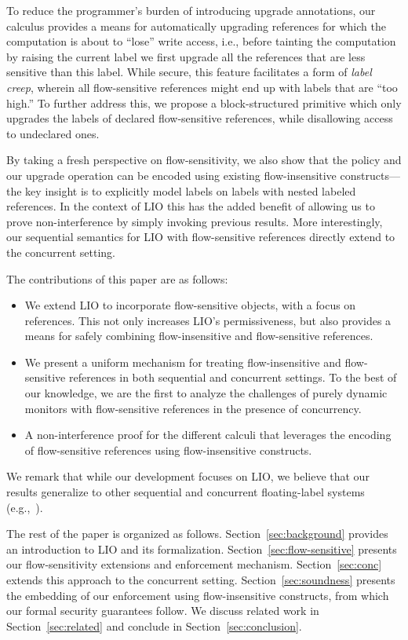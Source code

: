 To reduce the programmer's burden of introducing upgrade annotations, our
calculus provides a means for automatically upgrading references for which the
computation is about to ``lose'' write access, i.e., before tainting the
computation by raising the current label we first upgrade all the references
that are less sensitive than this label.
%
While secure, this feature facilitates a form of \emph{label creep},
wherein all flow-sensitive references might end up with labels that
are ``too high.''
%
To further address this, we propose a block-structured primitive which
only upgrades the labels of declared flow-sensitive references, while
disallowing access to undeclared ones.
 
By taking a fresh perspective on flow-sensitivity, we also show that the {\nsu}
policy and our upgrade operation can be encoded using existing flow-insensitive
constructs---the key insight is to explicitly model labels on labels with
nested labeled references.
%
In the context of LIO this has the added benefit of allowing us to prove
non-interference by simply invoking previous results.
%
More interestingly, our sequential semantics for LIO with flow-sensitive
references directly extend to the concurrent setting.
 
The contributions of this paper are as follows:
\begin{itemize}

\item We extend LIO to incorporate flow-sensitive objects, with a focus on
references. This not only increases LIO's permissiveness, but also provides a
means for safely combining flow-insensitive and flow-sensitive references.

\item We present a uniform mechanism for treating flow-insensitive and
flow-sensitive references in both sequential and concurrent settings. To the
best of our knowledge, we are the first to analyze the challenges of purely
dynamic monitors with flow-sensitive references in the presence of concurrency.

\item A non-interference proof for the different calculi that leverages the
encoding of flow-sensitive references using flow-insensitive constructs.
\end{itemize}
%
We remark that while our development focuses on LIO, we believe that
our results generalize to other sequential and concurrent
floating-label systems (e.g.,~\cite{Breeze, Efstathopoulos:2005,
zeldovich:histar, krohn:flume}).

The rest of the paper is organized as follows. Section~\ref{sec:background}
provides an introduction to LIO and its formalization.
Section~\ref{sec:flow-sensitive} presents our flow-sensitivity extensions and
enforcement mechanism. Section~\ref{sec:conc} extends this approach to the
concurrent setting. Section~\ref{sec:soundness} presents the embedding of our
enforcement using flow-insensitive constructs, from which our formal security
guarantees follow.  We discuss related work in Section~\ref{sec:related} and
conclude in Section~\ref{sec:conclusion}.


